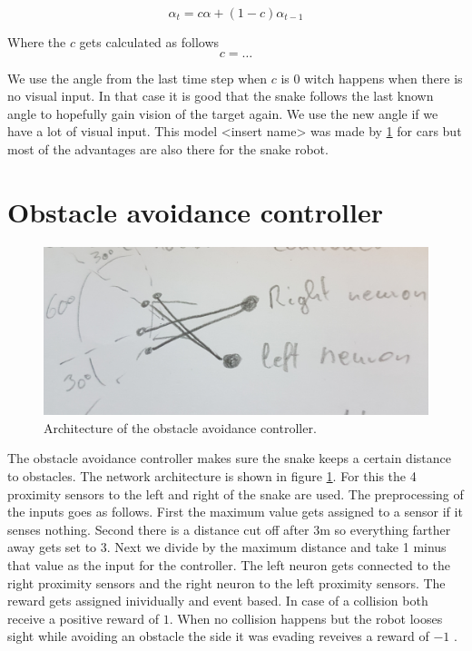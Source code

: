 \begin{equation}
\alpha_t = c \alpha + \left(1 - c\right) \alpha_{t-1}
\end{equation}

Where the $c$ gets calculated as follows
\begin{equation}
c = \dots
\end{equation}

We use the angle from the last time step when $c$ is $0$ witch happens when there is no visual input. In that case it is good that the snake follows the last known angle to hopefully gain vision of the target again. We use the new angle if we have a lot of visual input. This model <insert name> was made by \ref{} for cars but most of the advantages are also there for the snake robot.

\section{Obstacle avoidance controller}

\begin{figure}
	\includegraphics[width=\linewidth]{images/avoid_arch.jpg}
	\caption{Architecture of the obstacle avoidance controller.}
	\label{fig:avoid_arch}
\end{figure}
The obstacle avoidance controller makes sure the snake keeps a certain distance to obstacles. The network architecture is shown in figure \ref{fig:avoid_arch}. For this the 4 proximity sensors to the left and right of the snake are used. The preprocessing of the inputs goes as follows. First the maximum value gets assigned to a sensor if it senses nothing. Second there is a distance cut off after $3$m so everything farther away gets set to $3$. Next we divide by the maximum distance and take 1 minus that value as the input for the controller.
The left neuron gets connected to the right proximity sensors and the right neuron to the left proximity sensors. The reward gets assigned inividually and event based. In case of a collision both receive a positive reward of $1$. When no collision happens but the robot looses sight while avoiding an obstacle the side it was evading reveives a reward of $-1$ .


